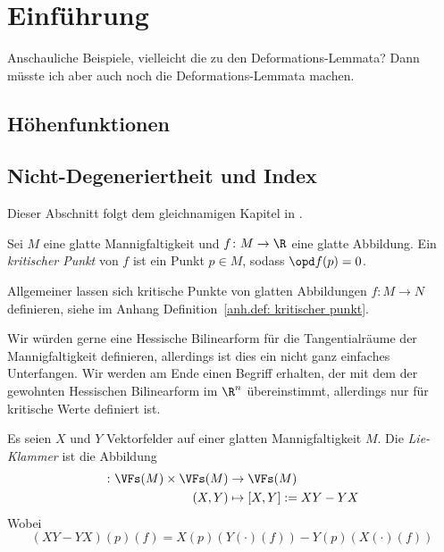 \chapter{Einführung}

Anschauliche Beispiele, vielleicht die zu den Deformations-Lemmata? Dann müsste
ich aber auch noch die Deformations-Lemmata machen.

\section{Höhenfunktionen}

\section{Nicht-Degeneriertheit und Index}

Dieser Abschnitt folgt dem gleichnamigen Kapitel in \cite{milnor}.

\begin{definition}
    \label{def: kritischer Punkt}
    Sei $M$ eine glatte Mannigfaltigkeit und $f \colon M \to \R$ eine glatte Abbildung. 
    Ein \textit{kritischer Punkt} von $f$ ist ein Punkt $p \in M$, sodass $\opd f (p) = 0$.
\end{definition}

\begin{remark}
    Allgemeiner lassen sich kritische Punkte von glatten Abbildungen $f \colon M \to N$ 
    definieren, siehe im Anhang Definition~\ref{anh.def: kritischer punkt}.
\end{remark}

Wir würden gerne eine Hessische Bilinearform für die Tangentialräume der Mannigfaltigkeit
definieren, allerdings ist dies ein nicht ganz einfaches Unterfangen. Wir werden am Ende
einen Begriff erhalten, der mit dem der gewohnten Hessischen Bilinearform im $\R^n$
übereinstimmt, allerdings nur für kritische Werte definiert ist.

\begin{definition}
    \label{def: lie-klammer}
    Es seien $X$ und $Y$ Vektorfelder auf einer glatten Mannigfaltigkeit $M$. Die 
    \textit{Lie-Klammer} ist die Abbildung 
    \begin{align*} 
        [\cdot, \cdot] \colon \VFs(M) \times \VFs(M) & \to \VFs(M) \\
        (X, Y) & \mapsto [X, Y] := XY - YX
    \end{align*}
    Wobei 
    \[ (XY - YX) (p) (f) = X(p)(Y(\cdot)(f)) - Y(p)(X(\cdot)(f)) \]
\end{definition}

